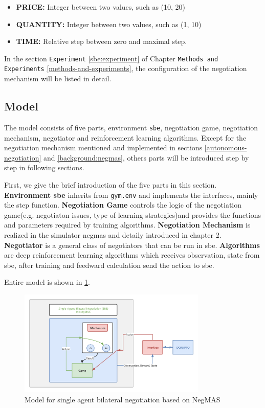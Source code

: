 \begin{itemize}
	\item \textbf{PRICE:} Integer between two values, such as (10, 20)
	\item \textbf{QUANTITY:} Integer between two values, such as (1, 10)
	\item \textbf{TIME:} Relative step between zero and maximal step.
\end{itemize}


In the section \texttt{Experiment} \ref{sbe:experiment} of Chapter \texttt{Methods and Experiments} \ref{methods-and-experiments}, the configuration of the negotiation mechanism will be listed in detail.
 
\subsection{Model}
The model consists of five parts, environment \texttt{\gls{sbe}}, negotiation game, negotiation mechanism, negotiator and reinforcement learning algorithms.
Except for the negotiation mechanism mentioned and implemented in sections \ref{autonomous-negotiation} and \ref{background:negmas}, others parts will be introduced step by step in following sections. 

First, we give the brief introduction of the five parts in this section.
\textbf{Environment \gls{sbe}} inherits from \texttt{gym.env} and implements the interfaces, mainly the step function. 
\textbf{Negotiation Game} controls the logic of the negotiation game(e.g. negotiaton issues, type of learning strategies)and provides the functions and parameters required by training algorithms.
\textbf{Negotiation Mechanism} is realized in the simulator \gls{negmas} and detaily introduced in chapter 2.
\textbf{Negotiator} is a general class of negotiators that can be run in \gls{sbe}.
\textbf{Algorithms} are deep reinforcement learning algorithms which receives observation, state from \gls{sbe}, after training and feedward calculation send the action to \gls{sbe}.

Entire model is shown in \ref{fig:environment-single-agent}.
\begin{figure}[htbp]
\centering
\includegraphics[width=0.80\textwidth]{./images/sbe.png}
\caption{Model for single agent bilateral negotiation based on NegMAS}
\label{fig:environment-single-agent}
\end{figure}


